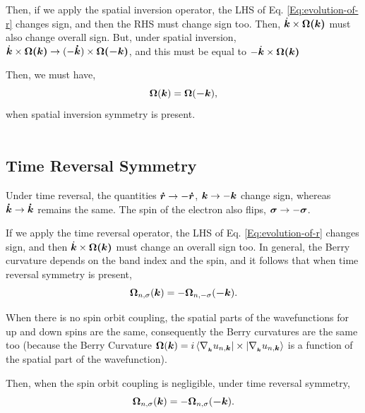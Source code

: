 \documentclass{report}
\renewcommand\vec[1]{\ensuremath\boldsymbol{#1}} %
\begin{document}
Then, if we apply the spatial inversion operator, the LHS of Eq. \eqref{Eq:evolution-of-r} changes sign, and then the RHS must change sign too. Then, $\dot{\vec{k}}\times \vec{\Omega(\vec{k})}$ must also change overall sign. But, under spatial inversion,  $\dot{\vec{k}}\times \vec{\Omega(\vec{k})} \rightarrow (-\vec{\dot{k}})\times \vec{\Omega(\vec{-k})}$, and this must be equal to $-\dot{\vec{k}}\times \vec{\Omega(\vec{k})}$

Then, we must have, 
\begin{equation}\label{Eq:OmegaSpatialInversion}
	\vec{\Omega}(\vec{k}) = \vec{\Omega}(\vec{-k}),
\end{equation}
when spatial inversion symmetry is present.\\\\

\subsection{Time Reversal Symmetry}
Under time reversal, the quantities $\vec{\dot{r}} \rightarrow -\vec{\dot{r}}$, $\vec{k} \rightarrow -\vec{k}$ change sign, whereas $\vec{\dot{k}} \rightarrow \vec{\dot{k}}$ remains the same. The spin of the electron also flips, $\vec{\sigma} \rightarrow -\vec{\sigma}$.

If we apply the time reversal operator, the LHS of Eq. \eqref{Eq:evolution-of-r} changes sign, and then $\dot{\vec{k}}\times \vec{\Omega(\vec{k})}$ must change an overall sign too. In general, the Berry curvature depends on the band index and the spin, and it follows that when time reversal symmetry is present,
\begin{equation}\label{Eq:OmegaTimeReversal}
	\vec{\Omega}_{n,\sigma}(\vec{k}) = -\vec{\Omega}_{n,-\sigma}(\vec{-k}).
\end{equation}

When there is no spin orbit coupling, the spatial parts of the wavefunctions for up and down spins are the same, consequently the Berry curvatures are the same too (because the Berry Curvature $\vec{\Omega}(\vec{k}) = i \bra{\nabla_{_{\vec{k}}} u_{n,\vec{k}}}\times \ket{\nabla_{_{\vec{k}}} u_{n,\vec{k}}}$ is a function of the spatial part of the wavefunction).

Then, when the spin orbit coupling is negligible, under time reversal symmetry,
\begin{equation}\label{Eq:OmegaTimeReversalzeroSpinOrbit}
	\vec{\Omega}_{n,\sigma}(\vec{k}) = -\vec{\Omega}_{n,\sigma}(\vec{-k}).
\end{equation}
\end{document}
